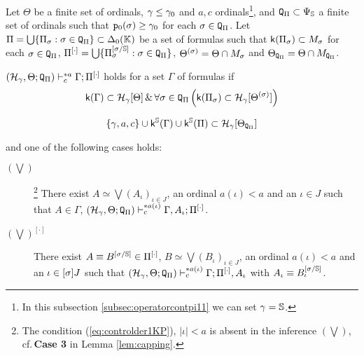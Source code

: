 \documentclass{article}
\newcommand{\mS}{\mathbb{S}}
\begin{document}
\bdf\label{df:controldercollapspi11}
{\rm
Let $\Theta$ be a finite set of ordinals, 
$\gamma\leq\gamma_{0}$ and $a,c$ ordinals\footnote{In this subsection \ref{subsec:operatorcontpi11}
we can set $\gam=\mS$.}, and
${\tt Q}_{\Pi}\subset\Psi_{\mS}$ a finite set of ordinals such that
${\tt p}_{0}(\sigma)\geq\gamma_{0}$
for each $\sigma\in{\tt Q}_{\Pi}$.
Let
$\Pi=\bigcup\{\Pi_{\sigma}:\sigma\in {\tt Q}_{\Pi}\}\subset\Delta_{0}(\mathbb{K})$ be a set of formulas
such that ${\sf k}(\Pi_{\sigma})\subset M_{\sigma}$ 
for each $\sigma\in{\tt Q}_{\Pi}$, 
$\Pi^{[\cdot]}=\bigcup\{\Pi_{\sig}^{[\sig/\mS]}:\sig\in {\tt Q}_{\Pi}\}$,
$\Theta^{(\sigma)}=\Theta\cap M_{\sigma}$
and
$\Theta_{{\tt Q}_{\Pi}}=\Theta\cap M_{{\tt Q}_{\Pi}}$.



$(\mathcal{H}_{\gamma},\Theta; {\tt Q}_{\Pi})\vdash^{* a}_{c} \Gamma;\Pi^{[\cdot]}$ holds
for a set
$\Gamma$ of formulas
if 
\begin{equation}
\label{eq:controlderpi11}
{\sf k}(\Gamma)\subset\mathcal{H}_{\gamma}[\Theta]
\,\&\,
\forall\sigma\in{\tt Q}_{\Pi}\left(
{\sf k}(\Pi_{\sigma})\subset{\cal H}_{\gamma}[\Theta^{(\sigma)}]
\right)
\end{equation}

\begin{equation}
\label{eq:controlderpi11ac}
\{\gam,a,c\}
\cup\sfk^{\mS}(\Gam)\cup\sfk^{\mS}(\Pi)
\subset\mathcal{H}_{\gamma}[\Theta_{{\tt Q}_{\Pi}}]
\end{equation}







and one of the following cases holds:



\begin{description}


\item[$(\bigvee)$]\footnote{The condition (\ref{eq:controlder1KP}), $|\iota|< a$ is absent in the inference $(\bigvee)$, cf.\,\textbf{Case 3} in Lemma \ref{lem:capping}.}
There exist 
$A\simeq\bigvee(A_{\iota})_{\iota\in J}$, an ordinal
$a(\iota)<a$ and an 
$\iota\in J$ such that
$A\in\Gamma$,
$(\mathcal{H}_{\gamma},\Theta;{\tt Q}_{\Pi})\vdash^{*a(\iota)}_{c}\Gamma,
A_{\iota};\Pi^{[\cdot]}$.


\item[$(\bigvee)^{[\cdot]}$]
There exist 
$A\equiv B^{[\sig/\mS]}\in\Pi^{[\cdot]}$,
$B\simeq\bigvee(B_{\iota})_{\iota\in J}$, an ordinal
$a(\iota)<a$ and an $\iota\in [\sigma]J$ such that
$(\mathcal{H}_{\gamma},\Theta;{\tt Q}_{\Pi})\vdash^{*a(\iota)}_{c}\Gamma;\Pi^{[\cdot]},
A_{\iota}$ with $A_{\iota}\equiv B_{\iota}^{[\sig/\mS]}$.



\end{description}}
\end{document}
